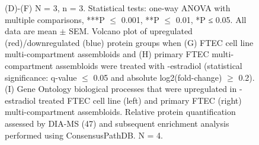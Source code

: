 \begin{refsection}
    \begin{figure}[h!]
        \ContinuedFloat
        \captionsetup{font=small}
        \caption[]{(D)-(F) N = 3, n = 3. Statistical tests: one-way ANOVA with multiple comparisons, ***P $≤$ 0.001, **P $≤$ 0.01, *P ≤ 0.05. All data are mean $±$ SEM. Volcano plot of upregulated (red)/downregulated (blue) protein groups when (G) FTEC cell line multi-compartment assembloids and (H) primary FTEC multi-compartment assembloids were treated with \textbeta-estradiol (statistical significance: q-value $≤$ 0.05 and absolute log2(fold-change) $≥$ 0.2). (I) Gene Ontology\cite{Ashburner2000Gene, ashburner2000a} biological processes that were upregulated in \textbeta-estradiol treated FTEC cell line (left) and primary FTEC (right) multi-compartment assembloids. Relative protein quantification assessed by DIA-MS (47) and subsequent enrichment analysis performed using ConsensusPathDB\cite{kamburov2009a,kamburov2011a}. N = 4.}
    \end{figure}


\end{refsection}
